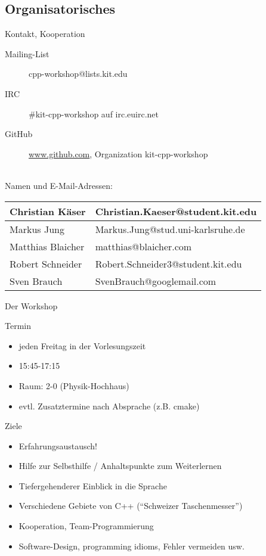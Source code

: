 \subsection{Organisatorisches}

\begin{frame}{Kontakt, Kooperation}
	\begin{description}
		\item[Mailing-List] cpp-workshop@lists.kit.edu
		\item[IRC] \#kit-cpp-workshop auf irc.euirc.net
		\item[GitHub]	\url{www.github.com}, Organization kit-cpp-workshop
	\end{description}
	\ \\
	
	Namen und E-Mail-Adressen:
	\begin{table}
		\begin{tabular}{l|l}
			Christian Käser	&	Christian.Kaeser@student.kit.edu	\\
			\hline
			Markus Jung		&	Markus.Jung@stud.uni-karlsruhe.de	\\
			\hline
			Matthias Blaicher	&	matthias@blaicher.com	\\
			\hline
			Robert Schneider	&	Robert.Schneider3@student.kit.edu	\\
			\hline
			Sven Brauch	&	SvenBrauch@googlemail.com	\\
		\end{tabular}
	\end{table}
\end{frame}

\begin{frame}{Der Workshop}
	\begin{block}{Termin}
		\begin{itemize}
			\item jeden Freitag in der Vorlesungszeit
			\item 15:45-17:15
			\item Raum: 2-0 (Physik-Hochhaus)
			\item evtl. Zusatztermine nach Absprache (z.B. cmake)
		\end{itemize}
	\end{block}
	\pause
	\begin{block}{Ziele}
		\begin{itemize}
			\item Erfahrungsaustausch!
			\item Hilfe zur Selbsthilfe / Anhaltspunkte zum Weiterlernen
			\item Tiefergehenderer Einblick in die Sprache
			\item Verschiedene Gebiete von C++ (\enquote{Schweizer Taschenmesser})
			\item Kooperation, Team-Programmierung
			\item Software-Design, programming idioms, Fehler vermeiden usw.
		\end{itemize}
	\end{block}
\end{frame}

